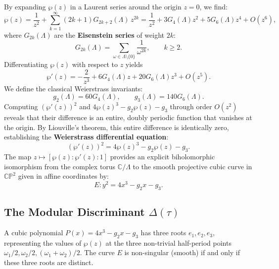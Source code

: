 \documentclass[a4paper]{article}
\begin{document}
By expanding $\wp(z)$ in a Laurent series around the origin $z = 0$, we find:
\begin{equation}
 \wp(z) = \frac{1}{z^2} + \sum_{k=1}^\infty (2k+1) G_{2k+2}(\Lambda) \, z^{2k} = \frac{1}{z^2} + 3 G_4(\Lambda) z^2 + 5 G_6(\Lambda) z^4 + O(z^6),
\end{equation}
where $G_{2k}(\Lambda)$ are the \textbf{Eisenstein series} of weight $2k$:
\begin{equation}
 G_{2k}(\Lambda) = \sum_{\omega \in \Lambda \setminus \{0\}} \frac{1}{\omega^{2k}}, \qquad k \ge 2.
\end{equation}
Differentiating $\wp(z)$ with respect to $z$ yields
\begin{equation}
 \wp'(z) = -\frac{2}{z^3} + 6 G_4(\Lambda) z + 20 G_6(\Lambda) z^3 + O(z^5).
\end{equation}
We define the classical Weierstrass invariants:
\begin{equation}
 g_2(\Lambda) = 60 G_4(\Lambda), \qquad g_3(\Lambda) = 140 G_6(\Lambda).
 \label{eq:g2_g3_def}
\end{equation}
Computing $(\wp'(z))^2$ and $4\wp(z)^3 - g_2\wp(z) - g_3$ through order $O(z^2)$ reveals that their difference is an entire, doubly periodic function that vanishes at the origin. By Liouville's theorem, this entire difference is identically zero, establishing the \textbf{Weierstrass differential equation}:
\begin{equation}
 \boxed{(\wp'(z))^2 = 4\wp(z)^3 - g_2 \wp(z) - g_3}.
 \label{eq:weierstrass_ode}
\end{equation}
The map $z \mapsto [\wp(z) : \wp'(z) : 1]$ provides an explicit biholomorphic isomorphism from the complex torus $\mathbb{C}/\Lambda$ to the smooth projective cubic curve in $\mathbb{C}\mathbb{P}^2$ given in affine coordinates by:
\begin{equation}
 E: y^2 = 4x^3 - g_2 x - g_3.
\end{equation}

\subsection{The Modular Discriminant \texorpdfstring{$\Delta(\tau)$}{Delta(tau)}}
A cubic polynomial $P(x) = 4x^3 - g_2 x - g_3$ has three roots $e_1, e_2, e_3$, representing the values of $\wp(z)$ at the three non-trivial half-period points $\omega_1/2, \omega_2/2, (\omega_1+\omega_2)/2$. The curve $E$ is non-singular (smooth) if and only if these three roots are distinct.
\end{document}
